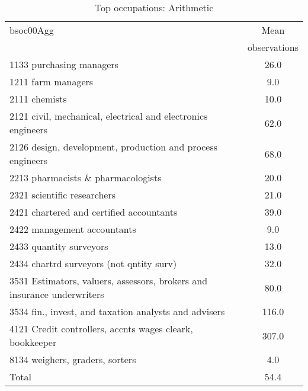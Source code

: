 \begin{table}
	\centering
	\caption{Top occupations: Arithmetic}
	\begin{tabular}{lc}
	\toprule	
		
bsoc00Agg&Mean \\
&observations \\
\hline
1133 purchasing managers&26.0 \\
1211 farm managers&9.0 \\
2111 chemists&10.0 \\
2121 civil, mechanical, electrical and electronics engineers&62.0 \\
2126 design, development, production and process engineers&68.0 \\
2213 pharmacists \& pharmacologists&20.0 \\
2321 scientific researchers&21.0 \\
2421 chartered and certified accountants&39.0 \\
2422 management accountants&9.0 \\
2433 quantity surveyors&13.0 \\
2434 chartrd surveyors (not qntity surv)&32.0 \\
3531 Estimators, valuers, assessors, brokers and insurance underwriters&80.0 \\
3534 fin., invest, and taxation analysts and advisers&116.0 \\
4121 Credit controllers, accnts wages cleark, bookkeeper&307.0 \\
8134 weighers, graders, sorters&4.0 \\
Total&54.4 \\
\bottomrule
\bottomrule
\end{tabular}
\end{table}
